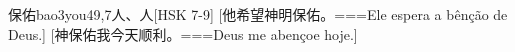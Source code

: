 \begin{EntryWithPhonetic}{保佑}{bao3you4}{9,7}{⼈、⼈}[HSK 7-9]
  [他希望神明保佑。===Ele espera a bênção de Deus.]
  [神保佑我今天顺利。===Deus me abençoe hoje.]
\end{EntryWithPhonetic}
